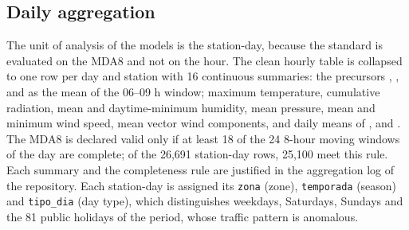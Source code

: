 \subsection{Daily aggregation}
\label{sec:agregacion-diaria}

The unit of analysis of the models is the station-day, because the standard
is evaluated on the MDA8 and not on the hour. The clean hourly table is
collapsed to one row per day and station with 16 continuous summaries: the
precursors , ,  and  as the mean of the
06--09 h window; maximum temperature, cumulative radiation, mean and
daytime-minimum humidity, mean pressure, mean and minimum wind speed, mean
vector wind components, and daily means of ,  and
. The MDA8 is declared valid only if at least 18 of the 24 8-hour
moving windows of the day are complete; of the 26,691 station-day rows,
25,100 meet this rule. Each summary and the completeness rule are justified
in the aggregation log of the repository. Each station-day is assigned its
\texttt{zona} (zone), \texttt{temporada} (season) and \texttt{tipo\_dia}
(day type), which distinguishes weekdays, Saturdays, Sundays and the 81
public holidays of the period, whose traffic pattern is anomalous.
